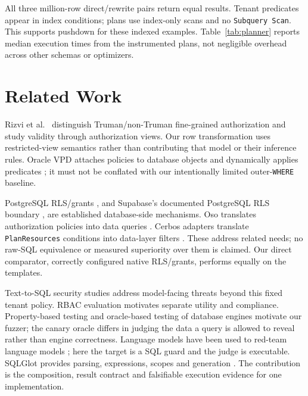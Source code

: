 \documentclass[sigconf,nonacm,natbib=false]{acmart}
\begin{document}
All three million-row direct/rewrite pairs return equal results. Tenant
predicates appear in index conditions; plans use index-only scans and no
\texttt{Subquery Scan}. This supports pushdown for these indexed examples.
Table~\ref{tab:planner} reports median execution times from the instrumented
plans, not negligible overhead across other schemas or optimizers.

\begin{table}[t]
\centering\scriptsize
\caption{Native server planner probe: one million rows, 50 tenants,
15 warm paired rounds. Times are from \texttt{EXPLAIN ANALYZE}; validation is excluded.}
\label{tab:planner}

\end{table}

\section{Related Work}
Rizvi et al.\ \cite{rizvi2004} distinguish Truman/non-Truman fine-grained
authorization and study validity through authorization views. Our row
transformation uses restricted-view semantics rather than contributing that
model or their inference rules. Oracle VPD attaches policies to database
objects and dynamically applies predicates \cite{oraclevpd}; it must not be
conflated with our intentionally limited outer-\texttt{WHERE} baseline.

PostgreSQL RLS/grants \cite{postgresrls}, and Supabase's documented PostgreSQL
RLS boundary \cite{supabaserls}, are established database-side mechanisms.
Oso translates authorization policies into data queries \cite{osofilter}.
Cerbos adapters translate \texttt{PlanResources} conditions into data-layer
filters \cite{cerbosfilter}. These address related needs; no raw-SQL
equivalence or measured superiority over them is claimed. Our direct
comparator, correctly configured native RLS/grants, performs equally on
the templates.

Text-to-SQL security studies \cite{peng2024security,song2024securesql}
address model-facing threats beyond this fixed tenant policy.
RBAC evaluation \cite{fei2026rbac} motivates separate utility and compliance.
Property-based testing \cite{claessen2000quickcheck,maciver2019hypothesis} and
oracle-based testing of database engines \cite{rigger2020pqs}
motivate our fuzzer; the canary oracle differs in judging the data a query is
allowed to reveal rather than engine correctness. Language models have been
used to red-team language models \cite{perez2022redteaming}; here the target is a
SQL guard and the judge is executable.
SQLGlot provides parsing, expressions, scopes and generation \cite{sqlglot}.
The contribution is the composition, result contract and falsifiable execution
evidence for one implementation.
\end{document}
